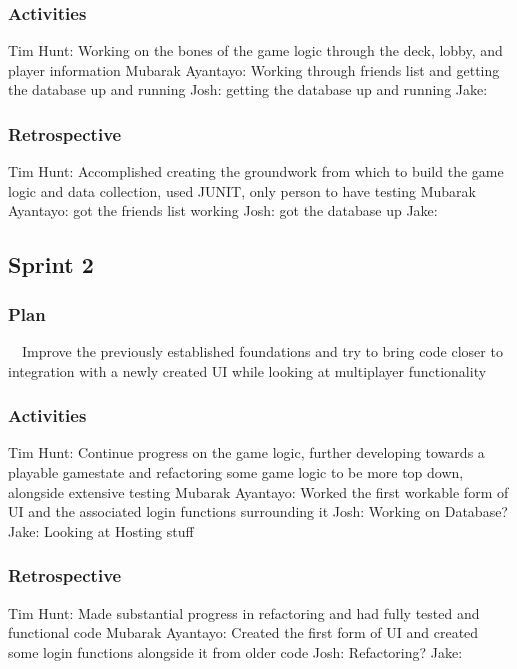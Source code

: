 \documentclass[12pt]{article}
\begin{document}
\subsubsection{Activities}
Tim Hunt: Working on the bones of the game logic through the deck, lobby, and player information \newline
Mubarak Ayantayo: Working through friends list and getting the database up and running \newline
Josh: getting the database up and running \newline
Jake:
\subsubsection{Retrospective}
Tim Hunt: Accomplished creating the groundwork from which to build the game logic and data collection, used JUNIT, only person to have testing \newline
Mubarak Ayantayo: got the friends list working \newline
Josh: got the database up \newline
Jake: 
\subsection{Sprint 2}
\subsubsection{Plan}
\ \ Improve the previously established foundations and try to bring code closer to integration with a newly created UI while looking at multiplayer functionality
\subsubsection{Activities}
Tim Hunt: Continue progress on the game logic, further developing towards a playable gamestate and refactoring some game logic to be more top down, alongside extensive testing \newline
Mubarak Ayantayo: Worked the first workable form of UI and the associated login functions surrounding it \newline
Josh: Working on Database? \newline
Jake: Looking at Hosting stuff \newline 
\subsubsection{Retrospective}
Tim Hunt: Made substantial progress in refactoring and had fully tested and functional code \newline
Mubarak Ayantayo: Created the first form of UI and created some login functions alongside it from older code \newline
Josh: Refactoring? \newline
Jake:
\end{document}
